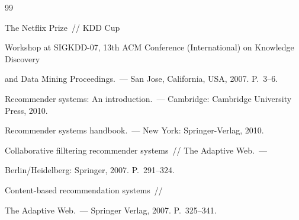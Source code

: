 {\small\frenchspacing


{%




\begin{thebibliography}{99}













 The Netflix Prize~/\!\!/  KDD Cup


Workshop at SIGKDD-07, 13th ACM  Conference (International) on Knowledge Discovery


and Data Mining Proceedings.~--- San Jose, California, USA, 2007. P.~3--6.












Recommender systems: An introduction.~--- Cambridge: Cambridge University Press, 2010.









  Recommender systems handbook.~--- New York: Springer-Verlag,   2010.


  






Collaborative filltering recommender systems~/\!\!/ The Adaptive Web.~---


Berlin/Heidelberg: Springer, 2007. P.~291--324.


  




 Content-based recommendation systems~/\!\!/ 


The Adaptive Web.~--- Springer Verlag, 2007. P.~325--341.









\end{thebibliography}}}
